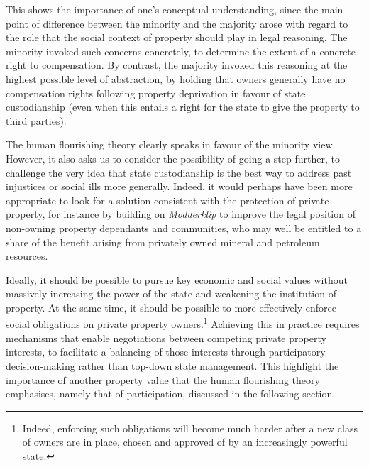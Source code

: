 This shows the importance of one's conceptual understanding, since the main point of difference between the minority and the majority arose with regard to the role that the social context of property should play in legal reasoning. The minority invoked such concerns concretely, to determine the extent of a concrete right to compensation. By contrast, the majority invoked this reasoning at the highest possible level of abstraction, by holding that owners generally have no compensation rights following property deprivation in favour of state custodianship (even when this entails a right for the state to give the property to third parties).

The human flourishing theory clearly speaks in favour of the minority view. However, it also asks us to consider the possibility of going a step further, to challenge the very idea that state custodianship is the best way to address past injustices or social ills more generally. Indeed, it would perhaps have been more appropriate to look for a solution consistent with the protection of private property, for instance by building on {\it Modderklip} to improve the legal position of non-owning property dependants and communities, who may well be entitled to a share of the benefit arising from privately owned mineral and petroleum resources.

Ideally, it should be possible to pursue key economic and social values without massively increasing the power of the state and weakening the institution of property. At the same time, it should be possible to more effectively enforce social obligations on private property owners.\footnote{Indeed, enforcing such obligations will become much harder after a new class of owners are in place, chosen and approved of by an increasingly powerful state. } Achieving this in practice requires mechanisms that enable negotiations between competing private property interests, to facilitate a balancing of those interests through participatory decision-making rather than top-down state management. This highlight the importance of another property value that the human flourishing theory emphasises, namely that of participation, discussed in the following section.

